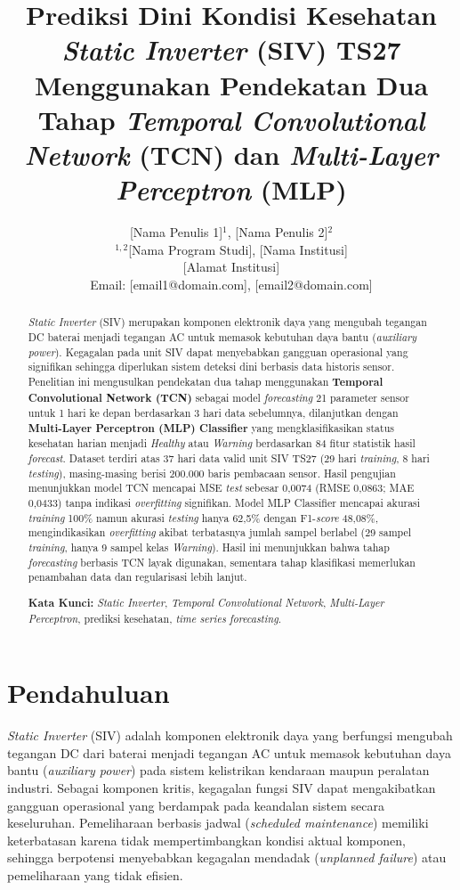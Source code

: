 \documentclass[11pt,a4paper]{article}
\title{\bfseries\Large Prediksi Dini Kondisi Kesehatan \textit{Static Inverter} (SIV) TS27 Menggunakan Pendekatan Dua Tahap \textit{Temporal Convolutional Network} (TCN) dan \textit{Multi-Layer Perceptron} (MLP)}
\author{
    [Nama Penulis 1]$^{1}$, [Nama Penulis 2]$^{2}$ \\[0.2cm]
    \small $^{1,2}$[Nama Program Studi], [Nama Institusi] \\
    \small [Alamat Institusi] \\
    \small Email: [email1@domain.com], [email2@domain.com]
}
\date{}
\begin{document}
\maketitle

\begin{abstract}
\noindent \textit{Static Inverter} (SIV) merupakan komponen elektronik daya yang mengubah tegangan DC baterai menjadi tegangan AC untuk memasok kebutuhan daya bantu (\textit{auxiliary power}). Kegagalan pada unit SIV dapat menyebabkan gangguan operasional yang signifikan sehingga diperlukan sistem deteksi dini berbasis data historis sensor. Penelitian ini mengusulkan pendekatan dua tahap menggunakan \textbf{Temporal Convolutional Network (TCN)} sebagai model \textit{forecasting} 21 parameter sensor untuk 1 hari ke depan berdasarkan 3 hari data sebelumnya, dilanjutkan dengan \textbf{Multi-Layer Perceptron (MLP) Classifier} yang mengklasifikasikan status kesehatan harian menjadi \textit{Healthy} atau \textit{Warning} berdasarkan 84 fitur statistik hasil \textit{forecast}. Dataset terdiri atas 37 hari data valid unit SIV TS27 (29 hari \textit{training}, 8 hari \textit{testing}), masing-masing berisi 200.000 baris pembacaan sensor. Hasil pengujian menunjukkan model TCN mencapai MSE \textit{test} sebesar 0,0074 (RMSE 0,0863; MAE 0,0433) tanpa indikasi \textit{overfitting} signifikan. Model MLP Classifier mencapai akurasi \textit{training} 100\% namun akurasi \textit{testing} hanya 62,5\% dengan F1-\textit{score} 48,08\%, mengindikasikan \textit{overfitting} akibat terbatasnya jumlah sampel berlabel (29 sampel \textit{training}, hanya 9 sampel kelas \textit{Warning}). Hasil ini menunjukkan bahwa tahap \textit{forecasting} berbasis TCN layak digunakan, sementara tahap klasifikasi memerlukan penambahan data dan regularisasi lebih lanjut.

\vspace{0.3cm}
\noindent \textbf{Kata Kunci:} \textit{Static Inverter}, \textit{Temporal Convolutional Network}, \textit{Multi-Layer Perceptron}, prediksi kesehatan, \textit{time series forecasting}.
\end{abstract}

\section{Pendahuluan}
\textit{Static Inverter} (SIV) adalah komponen elektronik daya yang berfungsi mengubah tegangan DC dari baterai menjadi tegangan AC untuk memasok kebutuhan daya bantu (\textit{auxiliary power}) pada sistem kelistrikan kendaraan maupun peralatan industri. Sebagai komponen kritis, kegagalan fungsi SIV dapat mengakibatkan gangguan operasional yang berdampak pada keandalan sistem secara keseluruhan. Pemeliharaan berbasis jadwal (\textit{scheduled maintenance}) memiliki keterbatasan karena tidak mempertimbangkan kondisi aktual komponen, sehingga berpotensi menyebabkan kegagalan mendadak (\textit{unplanned failure}) atau pemeliharaan yang tidak efisien.
\end{document}
